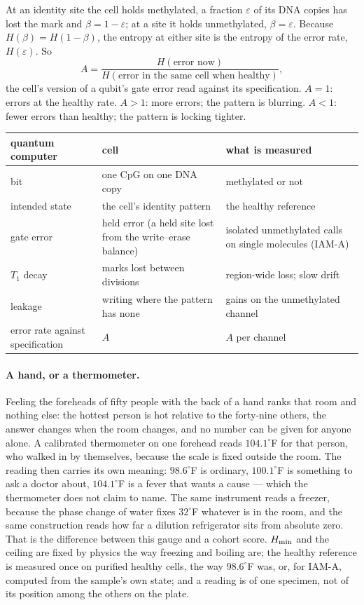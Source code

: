 At an identity site the cell holds methylated, a fraction $\varepsilon$ of its DNA copies has lost the mark and $\beta=1-\varepsilon$; at
a site it holds unmethylated, $\beta=\varepsilon$. Because $H(\beta)=H(1-\beta)$, the entropy at either site is the entropy of the error rate,
$H(\varepsilon)$. So
\begin{equation}
  A=\frac{H(\text{error now})}{H(\text{error in the same cell when healthy})},
\end{equation}
the cell's version of a qubit's gate error read against its specification. \derived{} $A=1$: errors at the healthy rate. $A>1$: more
errors; the pattern is blurring. $A<1$: fewer errors than healthy; the pattern is locking tighter.

\begin{center}\small
\begin{tabular}{@{}p{}p{}p{}@{}}\toprule
quantum computer & cell & what is measured \\\midrule
bit & one CpG on one DNA copy & methylated or not \\
intended state & the cell's identity pattern & the healthy reference \\
gate error & held error (a held site lost from the write--erase balance) & isolated unmethylated calls on single molecules (IAM-A) \\
$T_1$ decay & marks lost between divisions & region-wide loss; slow drift \\
leakage & writing where the pattern has none & gains on the unmethylated channel \\
error rate against specification & $A$ & $A$ per channel \\\bottomrule
\end{tabular}
\end{center}

\paragraph{A hand, or a thermometer.} Feeling the foreheads of fifty people with the back of a hand ranks that room and
nothing else: the hottest person is hot relative to the forty-nine others, the answer changes when the room changes, and no
number can be given for anyone alone. A calibrated thermometer on one forehead reads $104.1^\circ$F for that person, who walked
in by themselves, because the scale is fixed outside the room. The reading then carries its own meaning: $98.6^\circ$F is
ordinary, $100.1^\circ$F is something to ask a doctor about, $104.1^\circ$F is a fever that wants a cause --- which the
thermometer does not claim to name. The same instrument reads a freezer, because the phase change of water fixes
$32^\circ$F whatever is in the room, and the same construction reads how far a dilution refrigerator sits from absolute zero.
That is the difference between this gauge and a cohort score. $H_{\min}$ and the ceiling are fixed by physics the way freezing
and boiling are; the healthy reference is measured once on purified healthy cells, the way $98.6^\circ$F was, or, for IAM-A, computed from the sample's own state; and a reading
is of one specimen, not of its position among the others on the plate.

